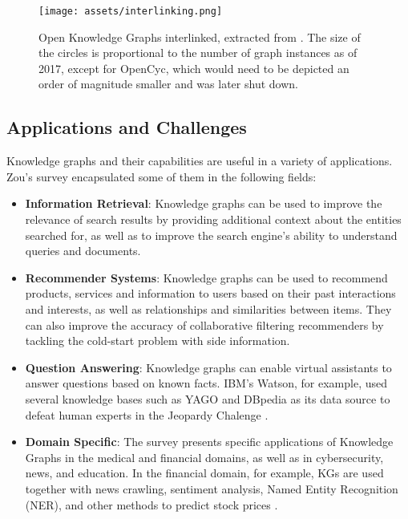 \documentclass[11pt,titlepage,oneside,openany]{book}
\begin{document}
\begin{figure}[h!]
    \centering
    \centerline{\texttt{[image: assets/interlinking.png]}}
    \caption{Open Knowledge Graphs interlinked, extracted from \cite{kern-isberner_one_2017}. The size of the circles is proportional to the number of graph instances as of 2017, except for OpenCyc, which would need to be depicted an order of magnitude smaller and was later shut down.}
    \label{fig:open-kg-interlinking}
\end{figure}


\subsection{Applications and Challenges}
\label{subsec:kg-application}

Knowledge graphs and their capabilities are useful in a variety of applications. Zou's survey \cite{zou_survey_2020} encapsulated some of them in the following fields:

\begin{itemize}
    \item \textbf{Information Retrieval}: Knowledge graphs can be used to improve the relevance of search results by providing additional context about the entities searched for, as well as to improve the search engine's ability to understand queries and documents.
    \item \textbf{Recommender Systems}: Knowledge graphs can be used to recommend products, services and information to users based on their past interactions and interests, as well as relationships and similarities between items. They can also improve the accuracy of collaborative filtering recommenders by tackling the cold-start problem with side information.
    \item \textbf{Question Answering}: Knowledge graphs can enable virtual assistants to answer questions based on known facts. IBM's Watson, for example, used several knowledge bases such as YAGO \cite{suchanek_yago_2007} and DBpedia \cite{lehmann_dbpedia_2015} as its data source to defeat human experts in the Jeopardy Chalenge \cite{ferrucci_building_2010}.
    \item \textbf{Domain Specific}: The survey presents specific applications of Knowledge Graphs in the medical and financial domains, as well as in cybersecurity, news, and education. In the financial domain, for example, KGs are used together with news crawling, sentiment analysis, Named Entity Recognition (NER), and other methods to predict stock prices \cite{liu_combining_2019}.
\end{itemize}
\end{document}
